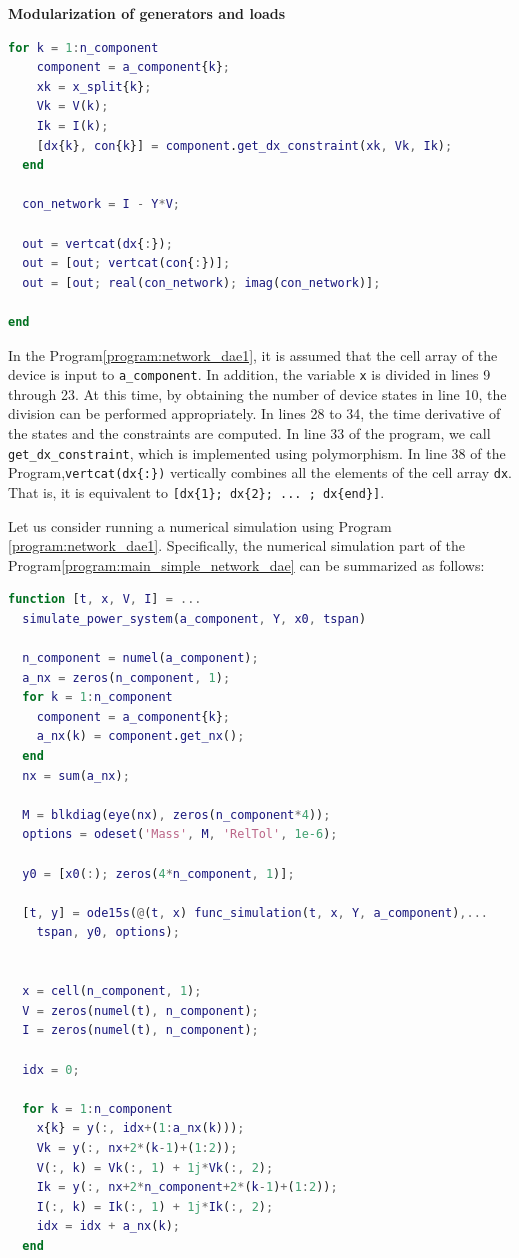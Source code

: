 \documentclass[graybox, envcountchap]{svmult}
\begin{document}
\begin{example}{\textbf{Modularization of generators and loads}}
\begin{lstlisting}[language=Matlab, caption=func\_simulation.m, label={program:network_dae1}]
  for k = 1:n_component
    component = a_component{k};
    xk = x_split{k};
    Vk = V(k);
    Ik = I(k);
    [dx{k}, con{k}] = component.get_dx_constraint(xk, Vk, Ik);
  end

  con_network = I - Y*V;

  out = vertcat(dx{:});
  out = [out; vertcat(con{:})];
  out = [out; real(con_network); imag(con_network)];

end
\end{lstlisting}

In the Program\nobreak\ref{program:network_dae1}, it is assumed that the cell
array of the device is input to \verb|a_component|. In addition, the variable
\verb|x| is divided in lines 9 through 23. At this time, by obtaining the number
of device states in line 10, the division can be performed appropriately. In
lines 28 to 34, the time derivative of the states and the constraints are
computed. In line 33 of the program, we call \verb|get_dx_constraint|, which is
implemented using polymorphism. In line 38 of the Program,\verb|vertcat(dx{:})|
vertically combines all the elements of the cell array \verb|dx|. That is, it is
equivalent to \verb|[dx{1}; dx{2}; ... ; dx{end}]|.

Let us consider running a numerical simulation using Program
\nobreak\ref{program:network_dae1}. Specifically, the numerical simulation part
of the Program\nobreak\ref{program:main_simple_network_dae} can be summarized as
follows: 

\begin{lstlisting}[language=Matlab, caption=simulate\_power\_system.m, label={program:simulate_network1}]
function [t, x, V, I] = ...
  simulate_power_system(a_component, Y, x0, tspan)

  n_component = numel(a_component);
  a_nx = zeros(n_component, 1);
  for k = 1:n_component
    component = a_component{k};
    a_nx(k) = component.get_nx();
  end
  nx = sum(a_nx);

  M = blkdiag(eye(nx), zeros(n_component*4));
  options = odeset('Mass', M, 'RelTol', 1e-6);

  y0 = [x0(:); zeros(4*n_component, 1)];

  [t, y] = ode15s(@(t, x) func_simulation(t, x, Y, a_component),...
    tspan, y0, options);


  x = cell(n_component, 1);
  V = zeros(numel(t), n_component);
  I = zeros(numel(t), n_component);

  idx = 0;

  for k = 1:n_component
    x{k} = y(:, idx+(1:a_nx(k)));
    Vk = y(:, nx+2*(k-1)+(1:2));
    V(:, k) = Vk(:, 1) + 1j*Vk(:, 2);
    Ik = y(:, nx+2*n_component+2*(k-1)+(1:2));
    I(:, k) = Ik(:, 1) + 1j*Ik(:, 2);
    idx = idx + a_nx(k);
  end


\end{lstlisting}
\end{example}
\end{document}
